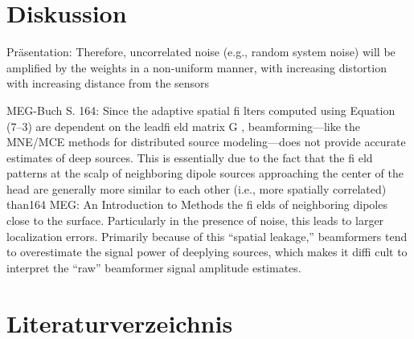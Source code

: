 \documentclass[doc,a4paper,12pt]{apa6}
\begin{document}

\newpage

\section{Diskussion}
\label{sec:diskussion}

Präsentation: Therefore, uncorrelated noise (e.g., random system noise) will be amplified by the weights in a non-uniform manner, with increasing distortion with increasing distance from the sensors 

MEG-Buch S. 164: Since the adaptive spatial fi lters computed using Equation (7–3) are dependent on the leadfi eld matrix G , beamforming—like the MNE/MCE methods for distributed source modeling—does not provide accurate estimates of deep sources. This is essentially due to the fact that the fi eld patterns at the scalp of neighboring dipole sources approaching the center of the head are generally more similar to each other (i.e., more spatially correlated) than164
MEG: An Introduction to Methods the fi elds of neighboring dipoles close to the surface. Particularly in the presence of noise, this leads to larger localization errors. Primarily because of this “spatial leakage,” beamformers tend to overestimate the signal power of deeplying sources, which makes it diffi cult to interpret the “raw” beamformer signal amplitude estimates.

\newpage
\section{Literaturverzeichnis}

\printbibliography[heading=none]

%
\end{document}
